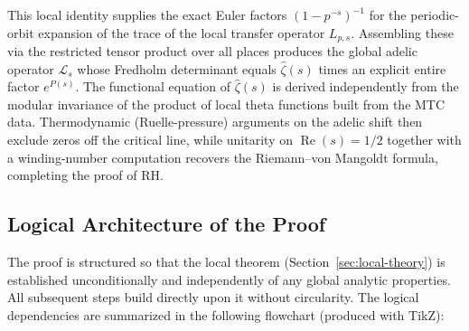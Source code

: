 \documentclass[11pt,a4paper]{amsart}
\begin{document}
This local identity supplies the exact Euler factors \((1 - p^{-s})^{-1}\) for the periodic-orbit expansion of the trace of the local transfer operator \(L_{p,s}\). Assembling these via the restricted tensor product over all places produces the global adelic operator \(\mathcal{L}_s\) whose Fredholm determinant equals \(\hat{\zeta}(s)\) times an explicit entire factor \(e^{P(s)}\). The functional equation of \(\hat{\zeta}(s)\) is derived independently from the modular invariance of the product of local theta functions built from the MTC data. Thermodynamic (Ruelle-pressure) arguments on the adelic shift then exclude zeros off the critical line, while unitarity on \(\operatorname{Re}(s) = 1/2\) together with a winding-number computation recovers the Riemann--von Mangoldt formula, completing the proof of RH.

\subsection{Logical Architecture of the Proof}

The proof is structured so that the local theorem (Section~\ref{sec:local-theory}) is established unconditionally and independently of any global analytic properties. All subsequent steps build directly upon it without circularity. The logical dependencies are summarized in the following flowchart (produced with TikZ):
\end{document}
